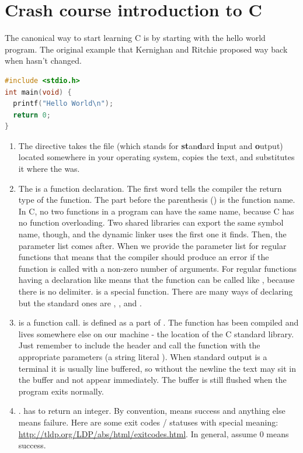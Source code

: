 \section{Crash course introduction to C}

The canonical way to start learning C is by starting with the hello world program.
The original example that Kernighan and Ritchie proposed way back when hasn't changed.

\begin{lstlisting}[language=C]
#include <stdio.h>
int main(void) {
  printf("Hello World\n");
  return 0;
}
\end{lstlisting}

\begin{enumerate}
	\item The  directive takes the file  (which stands for \textbf{st}an\textbf{d}ard \textbf{i}nput and \textbf{o}utput) located somewhere in your operating system, copies the text, and substitutes it where the  was.
	\item The  is a function declaration.
    The first word  tells the compiler the return type of the function.
    The part before the parenthesis () is the function name.
    In C, no two functions in a program can have the same name, because C has no function overloading.
    Two shared libraries can export the same symbol name, though, and the dynamic linker uses the first one it finds.
    Then, the parameter list comes after.
    When we provide the parameter list for regular functions  that means that the compiler should produce an error if the function is called with a non-zero number of arguments.
    For regular functions having a declaration like  means that the function can be called like , because there is no delimiter.
     is a special function.
    There are many ways of declaring  but the standard ones are , , and .
	\item {} is a function call.
     is defined as a part of .
    The function has been compiled and lives somewhere else on our machine - the location of the C standard library.
    Just remember to include the header and call the function with the appropriate parameters (a string literal ).
    When standard output is a terminal it is usually line buffered, so without the newline the text may sit in the buffer and not appear immediately.
    The buffer is still flushed when the program exits normally.
	\item {}.
     has to return an integer.
    By convention,  means success and anything else means failure.
    Here are some exit codes / statuses with special meaning: \url{http://tldp.org/LDP/abs/html/exitcodes.html}.
    In general, assume 0 means success.
\end{enumerate}

